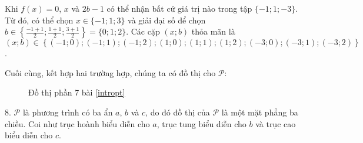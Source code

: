 Khi $f(x) = 0$, $x$ và $2b-1$ có thể nhận bất cứ giá trị nào trong tập $\{-1; 1; -3\}$. Từ đó, có thể chọn $x \in \{-1; 1; 3\}$ và giải đại số để chọn $b \in \left\{\frac{-1+1}{2}; \frac{1+1}{2}; \frac{3+1}{2}\right\} = \{0; 1; 2\}$. Các cặp $(x; b)$ thỏa mãn là $(x; b) \in \left\{\left(-1; 0\right); \left(-1; 1\right); \left(-1; 2\right); \left(1; 0\right); \left(1; 1\right); \left(1; 2\right); \left(-3; 0\right); \left(-3; 1\right); \left(-3; 2\right)\right\}$.

Cuối cùng, kết hợp hai trường hợp, chúng ta có đồ thị cho $\mathcal{P}$:

\begin{figure}[H]
   \centering
   \caption{Đồ thị phần 7 bài \ref{intropt}}
   \label{fig:dtp7}
\end{figure}

8. $\mathcal{P}$ là phương trình có ba ẩn $a$, $b$ và $c$, do đó đồ thị của $\mathcal{P}$ là một mặt phẳng ba chiều. Coi như trục hoành biểu diễn cho $a$, trục tung biểu diễn cho $b$ và trục cao biểu diễn cho $c$.


